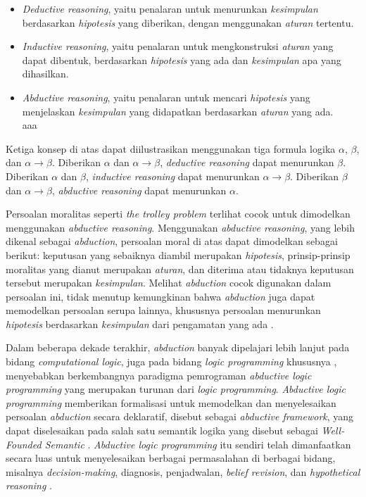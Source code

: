\begin{itemize}
	\item \textit{Deductive reasoning}, yaitu penalaran untuk menurunkan \textit{kesimpulan} berdasarkan \textit{hipotesis} yang diberikan, dengan menggunakan \textit{aturan} tertentu.
	\item \textit{Inductive reasoning}, yaitu penalaran untuk mengkonstruksi \textit{aturan} yang dapat dibentuk, berdasarkan \textit{hipotesis} yang ada dan \textit{kesimpulan} apa yang dihasilkan.
	\item \textit{Abductive reasoning}, yaitu penalaran untuk mencari \textit{hipotesis} yang menjelaskan \textit{kesimpulan} yang didapatkan berdasarkan \textit{aturan} yang ada.
	\\ aaa
\end{itemize}
Ketiga konsep di atas dapat diilustrasikan menggunakan tiga formula logika $\alpha$, $\beta$, dan $\alpha \rightarrow \beta$. Diberikan $\alpha$ dan $\alpha \rightarrow \beta$, \textit{deductive reasoning} dapat menurunkan $\beta$. Diberikan $\alpha$ dan $\beta$, \textit{inductive reasoning} dapat menurunkan $\alpha \rightarrow \beta$. Diberikan $\beta$ dan $\alpha \rightarrow \beta$, \textit{abductive reasoning} dapat menurunkan $\alpha$.

Persoalan moralitas seperti \textit{the trolley problem} terlihat cocok untuk dimodelkan menggunakan \textit{abductive reasoning}. Menggunakan \textit{abductive reasoning}, yang lebih dikenal sebagai \textit{abduction}, persoalan moral di atas dapat dimodelkan sebagai berikut: keputusan yang sebaiknya diambil merupakan \textit{hipotesis}, prinsip-prinsip moralitas yang dianut merupakan \textit{aturan}, dan diterima atau tidaknya keputusan tersebut merupakan \textit{kesimpulan}. Melihat \textit{abduction} cocok digunakan dalam persoalan ini, tidak menutup kemungkinan bahwa \textit{abduction} juga dapat memodelkan persoalan serupa lainnya, khususnya persoalan menurunkan \textit{hipotesis} berdasarkan \textit{kesimpulan} dari pengamatan yang ada \cite{menzies1996applications}.

Dalam beberapa dekade terakhir, \textit{abduction} banyak dipelajari lebih lanjut pada bidang \textit{computational logic}, juga pada bidang \textit{logic programming} khususnya \cite{eiter1997abduction,kakas1992abductive,saptawijaya2015tabdual}, menyebabkan berkembangnya paradigma pemrograman \textit{abductive logic programming} yang merupakan turunan dari \textit{logic programming}. \textit{Abductive logic programming} memberikan formalisasi untuk memodelkan dan menyelesaikan persoalan \textit{abduction} secara deklaratif, disebut sebagai \textit{abductive framework}, yang dapat diselesaikan pada salah satu semantik logika yang disebut sebagai \textit{Well-Founded Semantic} \cite{pereira2016programming}. \textit{Abductive logic programming} itu sendiri telah dimanfaatkan secara luas untuk menyelesaikan berbagai permasalahan di berbagai bidang, misalnya \textit{decision-making}, diagnosis, penjadwalan, \textit{belief revision}, dan \textit{hypothetical reasoning} \cite{kakas2001abductive,de2004abductive,gartner2000psychiatric,kowalski2011abductive}.

